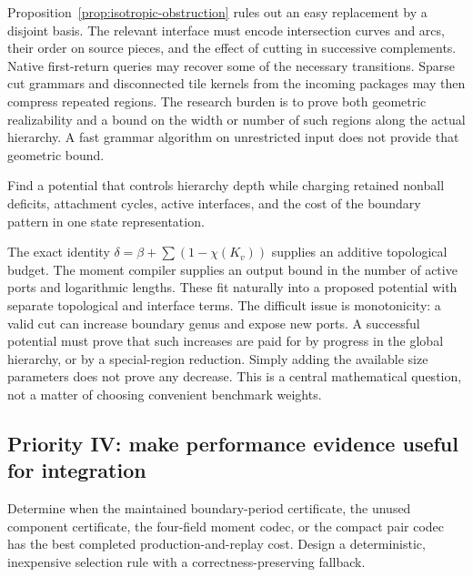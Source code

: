 Proposition~\ref{prop:isotropic-obstruction} rules out an easy replacement
by a disjoint basis.  The relevant interface must encode intersection
curves and arcs, their order on source pieces, and the effect of cutting
in successive complements.  Native first-return queries may recover
some of the necessary transitions.  Sparse cut grammars and disconnected
tile kernels from the incoming packages may then compress repeated
regions.  The research burden is to prove both geometric realizability
and a bound on the width or number of such regions along the actual
hierarchy.  A fast grammar algorithm on unrestricted input does not
provide that geometric bound.

\begin{problem}
Find a potential that controls hierarchy depth while charging retained
nonball deficits, attachment cycles, active interfaces, and the cost of
the boundary pattern in one state representation.
\end{problem}

The exact identity $\delta=\beta+\sum(1-\chi(K_v))$ supplies an additive
topological budget.  The moment compiler supplies an output bound in the
number of active ports and logarithmic lengths.  These fit naturally
into a proposed potential with separate topological and interface terms.
The difficult issue is monotonicity: a valid cut can increase boundary
genus and expose new ports.  A successful potential must prove that such
increases are paid for by progress in the global hierarchy, or by a
special-region reduction.  Simply adding the available size parameters
does not prove any decrease.  This is a central mathematical question,
not a matter of choosing convenient benchmark weights.

\subsection{Priority IV: make performance evidence useful for integration}

\begin{problem}
Determine when the maintained boundary-period certificate, the unused
component certificate, the four-field moment codec, or the compact pair
codec has the best completed production-and-replay cost.  Design a
deterministic, inexpensive selection rule with a correctness-preserving
fallback.
\end{problem}

